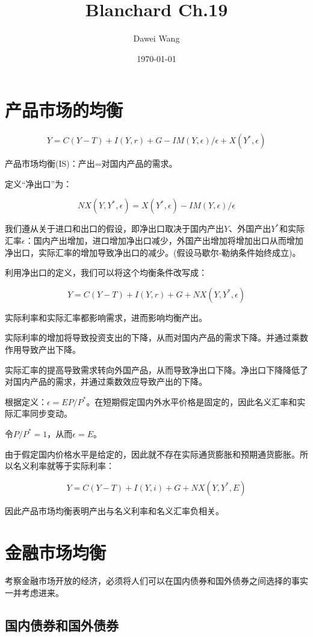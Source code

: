 \documentclass{article}
\title{Blanchard Ch.19}
\author{Dawei Wang}
\date{\today}
\begin{document}
	\maketitle

\section{产品市场的均衡}

\[
Y=C(Y-T)+I(Y,r)+G-IM(Y,\epsilon)/\epsilon+X(Y^*,\epsilon)
\]

产品市场均衡(IS)：产出=对国内产品的需求。

定义“净出口”为：

\[
NX(Y,Y^*,\epsilon)=X(Y^*,\epsilon)-IM(Y,\epsilon)/\epsilon
\]

我们遵从关于进口和出口的假设，即净出口取决于国内产出$ Y $、外国产出$ Y^* $和实际汇率$\epsilon$：国内产出增加，进口增加净出口减少，外国产出增加将增加出口从而增加净出口，实际汇率的增加导致净出口的减少。(假设马歇尔-勒纳条件始终成立)。

利用净出口的定义，我们可以将这个均衡条件改写成：

\[
Y=C(Y-T)+I(Y,r)+G+NX(Y,Y^*,\epsilon)
\]

实际利率和实际汇率都影响需求，进而影响均衡产出。

实际利率的增加将导致投资支出的下降，从而对国内产品的需求下降。并通过乘数作用导致产出下降。

实际汇率的提高导致需求转向外国产品，从而导致净出口下降。净出口下降降低了对国内产品的需求，并通过乘数效应导致产出的下降。

\hspace*{\fill}

根据定义：$\epsilon=EP/P^*$。在短期假定国内外水平价格是固定的，因此名义汇率和实际汇率同步变动。

令$ P/P^*=1 $，从而$ \epsilon=E $。

由于假定国内价格水平是给定的，因此就不存在实际通货膨胀和预期通货膨胀。所以名义利率就等于实际利率：

\[
Y=C(Y-T)+I(Y,i)+G+NX(Y,Y^*,E)
\]

因此产品市场均衡表明产出与名义利率和名义汇率负相关。

\section{金融市场均衡}

考察金融市场开放的经济，必须将人们可以在国内债券和国外债券之间选择的事实一并考虑进来。

\subsection{国内债券和国外债券}
\end{document}
